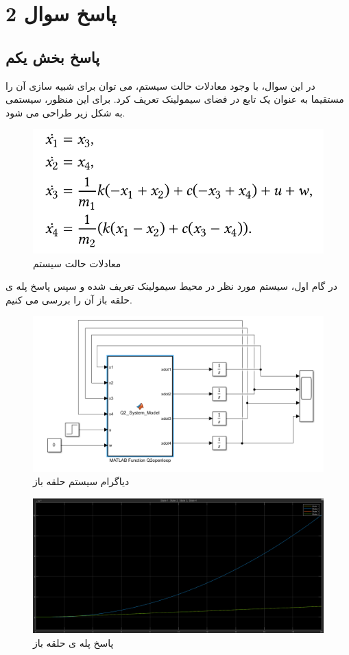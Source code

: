 \section*{پاسخ سوال 2}
\subsection*{پاسخ بخش یکم}
در این سوال، با وجود معادلات حالت سیستم، می توان برای شبیه سازی آن را مستقیما به عنوان یک تابع در فضای سیمولینک تعریف کرد. برای این منظور، سیستمی به شکل زیر طراحی می شود.
\begin{figure}[H]
	\centering
	\includegraphics[width=0.7\linewidth]{../img/Q2_SS}
	\caption{معادلات حالت سیستم}
	\label{fig:q2ss}
\end{figure}
 در گام اول، سیستم مورد نظر در محیط سیمولینک تعریف شده و سپس پاسخ پله ی حلقه باز آن را بررسی می کنیم.
\begin{figure}[H]
	\centering
	\includegraphics[width=1\linewidth]{../img/Q2_openloop_diagram}
	\caption{دیاگرام سیستم حلقه باز}
	\label{fig:q2openloopdiagram}
\end{figure}
\begin{figure}[H]
	\centering
	\includegraphics[width=1\linewidth]{../img/Q2_openloop_response}
	\caption{پاسخ پله ی حلقه باز}
	\label{fig:q2openloopresponse}
\end{figure}

